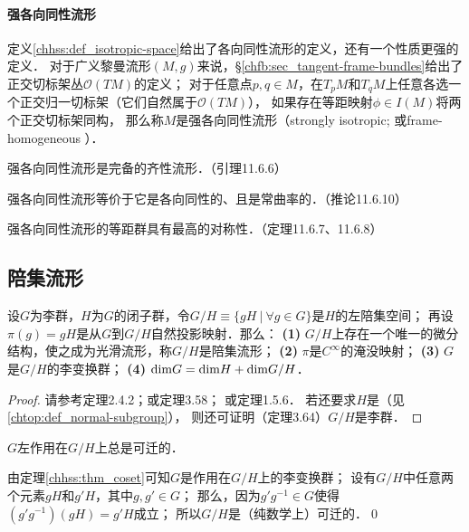    

\paragraph{强各向同性流形}
定义\ref{chhss:def_isotropic-space}给出了{\kaishu 各向同性流形}的定义，还有一个性质更强的定义．
对于广义黎曼流形$(M,g)$来说，\S\ref{chfb:sec_tangent-frame-bundles}给出了正交切标架丛$\mathcal{O}(TM)$的定义；
对于任意点$p,q\in M$，在$T_p M$和$T_q M$上任意各选一个正交归一切标架（它们自然属于$\mathcal{O}(TM)$），
如果存在等距映射$\phi\in I(M)$将两个正交切标架同构，
那么称$M$是{\heiti 强各向同性流形}（strongly isotropic; 或frame-homogeneous ）．

强各向同性流形是完备的齐性流形．（\parencite{wolf_SCC-2011}引理11.6.6）

强各向同性流形{\kaishu 等价于}它是各向同性的、且是常曲率的．（\parencite{wolf_SCC-2011}推论11.6.10）

强各向同性流形的等距群具有最高的对称性．（\parencite{wolf_SCC-2011}定理11.6.7、11.6.8）




\subsection{陪集流形}

\begin{theorem}\label{chhss:thm_coset}
    设$G$为李群，$H$为$G$的闭子群，令$G/H\equiv \{g H \ |\ \forall g\in G \}$是$H$的左陪集空间；
    再设$\pi(g)=g H$是从$G$到$G/H${\heiti 自然投影映射}．那么：    
    {\bfseries (1)} $G/H$上存在一个唯一的微分结构，使之成为光滑流形，称$G/H$是{\heiti 陪集流形}；    
    {\bfseries (2)} $\pi$是$C^\infty$的{\kaishu 淹没}映射；    
    {\bfseries (3)} $G$是$G/H$的李变换群；        
    {\bfseries (4)} ${\rm dim}G = {\rm dim}H + {\rm dim}G/H$．
\end{theorem}
\begin{proof}
    请参考\parencite{helgason-2001}定理2.4.2；或\parencite{warner-1983-FDMLG}定理3.58；
    或\parencite[\S 1.5]{wolf_SCC-2011}定理1.5.6．
    若还要求$H$是（见\ref{chtop:def_normal-subgroup}），
    则还可证明（\parencite{warner-1983-FDMLG}定理3.64）$G/H$是{\kaishu 李群}．
\end{proof}

\begin{example}\label{chhss:exm_ghtra}
    $G$左作用在$G/H$上总是可迁的．
\end{example}
由定理\ref{chhss:thm_coset}可知$G$是作用在$G/H$上的李变换群；
设有$G/H$中任意两个元素$gH$和$g' H$，其中$g,g'\in G$；
那么，因为$g' g^{-1} \in G$使得$(g' g^{-1}) (gH) = g' H$成立；
所以$G/H$是（纯数学上）可迁的．\qed

